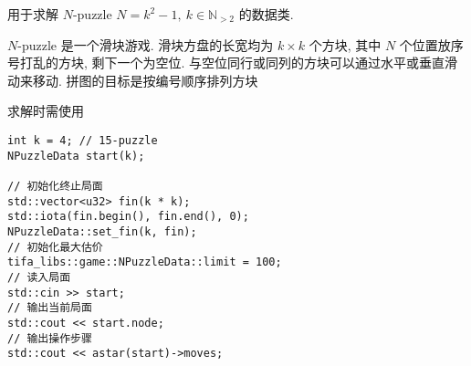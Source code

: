 用于求解 \(N\)-puzzle \(N=k^2-1,~k\in\mathbb{N}_{>2}\) 的数据类.

\(N\)-puzzle 是一个滑块游戏. 滑块方盘的长宽均为 \(k\times k\) 个方块, 其中 \(N\) 个位置放序号打乱的方块, 剩下一个为空位. 与空位同行或同列的方块可以通过水平或垂直滑动来移动. 拼图的目标是按编号顺序排列方块

求解时需使用 

\begin{verbatim}
int k = 4; // 15-puzzle
NPuzzleData start(k);

// 初始化终止局面
std::vector<u32> fin(k * k);
std::iota(fin.begin(), fin.end(), 0);
NPuzzleData::set_fin(k, fin);
// 初始化最大估价
tifa_libs::game::NPuzzleData::limit = 100;
// 读入局面
std::cin >> start;
// 输出当前局面
std::cout << start.node;
// 输出操作步骤
std::cout << astar(start)->moves;
\end{verbatim}
